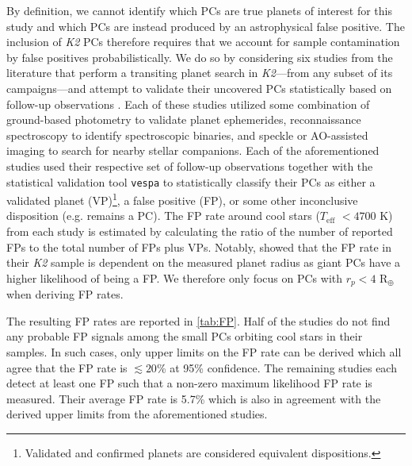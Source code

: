 \documentclass[twocolumn]{emulateapj}
\newcommand{\ktwo}[1]{\emph{K2}#1}
\newcommand{\teff}[1]{$T_{\text{eff}}$#1}
\begin{document}
By definition, we cannot identify which PCs are true planets of interest for this study and
which PCs are instead produced by an astrophysical false positive. 
The inclusion of \ktwo{} PCs therefore requires that we account for sample contamination by false positives
probabilistically. We do so by considering six
studies from the literature that perform a transiting planet search in \ktwo{---}from any subset of its
campaigns---and attempt to validate their uncovered PCs statistically based on follow-up observations
\citep{montet15,crossfield16b,dressing17,hirano18,livingston18a,mayo18}. Each of these studies utilized some combination of
ground-based photometry to validate planet ephemerides, reconnaissance
spectroscopy to identify spectroscopic binaries, and speckle or AO-assisted imaging to search for nearby stellar companions.
Each of the aforementioned studies used their respective set of follow-up observations together with the
statistical validation tool \texttt{vespa} \citep{morton12,morton15} to statistically classify their PCs as either a validated
planet (VP)\footnote{Validated and confirmed planets are considered equivalent dispositions.},
a false positive (FP), or some other inconclusive disposition (e.g. remains a PC). The FP rate around cool
stars (\teff{} $< 4700$ K) from each study is estimated by calculating the ratio of the number of reported FPs to
the total number of FPs plus VPs. Notably, \cite{crossfield16b} showed that the FP rate in their \ktwo{} sample is dependent
on the measured planet radius as giant PCs have a higher likelihood of
being a FP. We therefore only focus on PCs with $r_p<4$ R$_{\oplus}$ when deriving FP rates.

The resulting FP rates are reported in \autoref{tab:FP}. Half of the studies do not find any probable
FP signals among the small PCs orbiting cool stars in their samples. In such cases, only upper limits on the FP rate
can be derived which all agree that the FP rate is $\lesssim 20$\% at 95\% confidence. The remaining studies
each detect at least one FP such that a non-zero maximum likelihood FP rate is measured. Their average FP rate is 5.7\%
which is also in agreement with the derived upper limits from the aforementioned studies.


\end{document}
